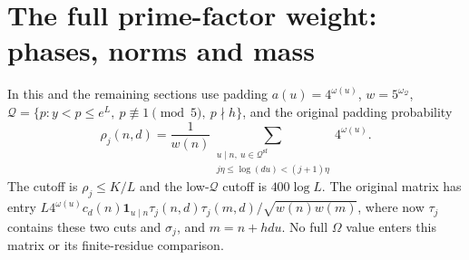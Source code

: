 \documentclass[11pt]{article}
\theoremstyle{definition}
\newcommand{\ind}{\mathbf 1}
\theoremstyle{remark}
\numberwithin{equation}{section}
\newcommand{\Qset}{\mathcal Q}
\newcommand{\sfw}{\mathrm{sf}}
\begin{document}
\section{The full prime-factor weight: phases, norms and mass}\label{sec:full}
In this and the remaining sections use padding $a(u)=4^{\omega(u)}$, $w=5^{\omega_{\Qset}}$,
$\Qset=\{p:y<p\le e^L,\ p\not\equiv1\pmod5,\ p\nmid h\}$, and the original padding probability
\begin{equation}\label{eq:original-rho}
 \rho_j(n,d)=\frac1{w(n)}\sum_{\substack{u\mid n,\ u\in\Qset^{\sfw}\\j\eta\le\log(du)<(j+1)\eta}}4^{\omega(u)}.
\end{equation}
The cutoff is $\rho_j\le K/L$ and the low-$\Qset$ cutoff is $400\log L$.
The original matrix has entry $L4^{\omega(u)}c_d(n)\ind_{u\mid n}\tau_j(n,d)\tau_j(m,d)/\sqrt{w(n)w(m)}$,
where now $\tau_j$ contains these two cuts and $\sigma_j$, and $m=n+hdu$.
No full $\Omega$ value enters this matrix or its finite-residue comparison.
\end{document}
